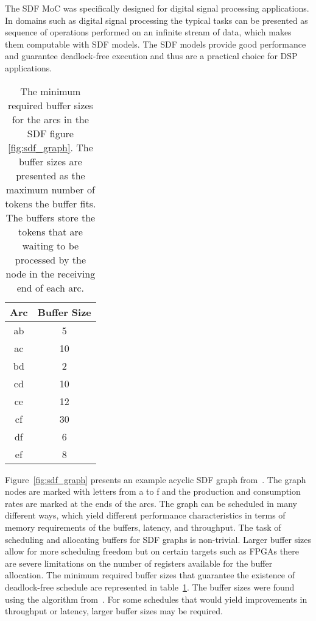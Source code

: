 The SDF MoC was specifically designed for digital signal processing applications. In domains such as digital signal processing the typical tasks can be presented as sequence of operations performed on an infinite stream of data, which makes them computable with SDF models. The SDF models provide good performance and guarantee deadlock-free execution and thus are a practical choice for DSP applications.~\cite{lee2015introduction}

\begin{table}
    \begin{center}
        \begin{tabular}{ c c }
            Arc & Buffer Size \\ \hline
            ab  & 5 \\ \hline
            ac  & 10 \\ \hline
            bd  & 2 \\ \hline
            cd  & 10 \\ \hline
            ce  & 12 \\ \hline
            cf  & 30 \\ \hline
            df  & 6 \\ \hline
            ef  & 8 \\ \hline
        \end{tabular}
        \caption{The minimum required buffer sizes for the arcs in the SDF figure \ref{fig:sdf_graph}. The buffer sizes are presented as the maximum number of tokens the buffer fits. The buffers store the tokens that are waiting to be processed by the node in the receiving end of each arc.}
        \label{tab:sdf_buffers}
    \end{center}
\end{table}

Figure~\ref{fig:sdf_graph} presents an example acyclic SDF graph from~\cite{ade1997data}. The graph nodes are marked with letters from a to f and the production and consumption rates are marked at the ends of the arcs. The graph can be scheduled in many different ways, which yield different performance characteristics in terms of memory requirements of the buffers, latency, and throughput. The task of scheduling and allocating buffers for SDF graphs is non-trivial. Larger buffer sizes allow for more scheduling freedom but on certain targets such as FPGAs there are severe limitations on the number of registers available for the buffer allocation. The minimum required buffer sizes that guarantee the existence of deadlock-free schedule are represented in table~\ref{tab:sdf_buffers}. The buffer sizes were found using the algorithm from~\cite{ade1997data}. For some schedules that would yield improvements in throughput or latency, larger buffer sizes may be required.

